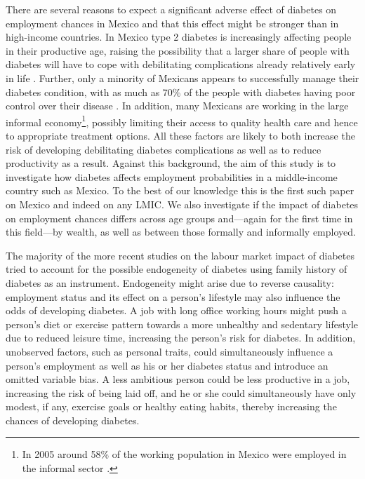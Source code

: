 There are several reasons to expect a significant adverse
effect of diabetes on employment chances in Mexico and that this effect
might be stronger than in high-income countries. In Mexico type 2
diabetes is increasingly affecting people in their productive age,
raising the possibility that a larger share of people with diabetes
will have to cope with debilitating complications already relatively
early in life \parencite{Barquera2013,Villalpando2010}. Further, only
a minority of Mexicans appears to successfully manage their diabetes
condition, with as much as 70\% of the people with diabetes
having poor control over their disease \parencite{Villalpando2010}. In
addition, many Mexicans are working in the large informal economy\footnote{In 2005 around 58\% of the working population in Mexico were
employed in the informal sector \parencite{Aguila2011}.}, possibly limiting their access to quality health care and hence
to appropriate treatment options. All these factors are likely to
both increase the risk of developing debilitating diabetes complications
as well as to reduce productivity as a result. Against this background,
the aim of this study is to investigate how diabetes affects employment
probabilities in a middle-income country such as Mexico. To the best
of our knowledge this is the first such paper on Mexico and indeed
on any \ac{LMIC}. We also investigate if the impact of diabetes on
employment chances differs across age groups and---again for the
first time in this field---by wealth, as well as between those formally
and informally employed.

The majority of the more recent studies on the labour market
impact of diabetes tried to account for the possible endogeneity of
diabetes using family history of diabetes as an instrument. Endogeneity
might arise due to reverse causality: employment status and its effect
on a person's lifestyle may also influence the odds of developing
diabetes. A job with long office working hours might push a person's
diet or exercise pattern towards a more unhealthy and sedentary lifestyle
due to reduced leisure time, increasing the person's risk for diabetes.
In addition, unobserved factors, such as personal traits, could simultaneously
influence a person's employment as well as his or her diabetes status
and introduce an omitted variable bias. A less ambitious person could
be less productive in a job, increasing the risk of being laid off,
and he or she could simultaneously have only modest, if any, exercise
goals or healthy eating habits, thereby increasing the chances of
developing diabetes.

